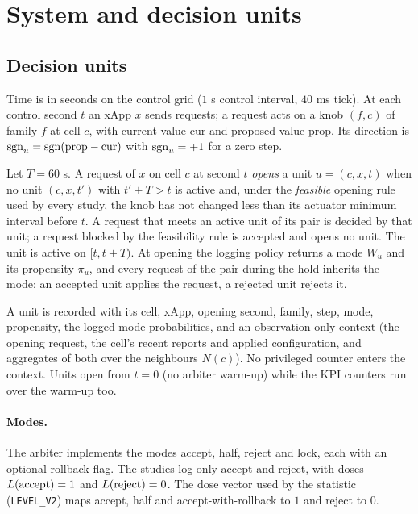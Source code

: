 \section{System and decision units}
\label{spec:sys}

\subsection{Decision units}
\label{spec:sys.unit}

Time is in seconds on the control grid ($1$ s control interval, $40$ ms tick). At each control second $t$ an xApp $x$ sends requests; a request acts on a knob $(f, c)$ of family $f$ at cell $c$, with current value $\mathrm{cur}$ and proposed value $\mathrm{prop}$. Its direction is $\mathrm{sgn}_u = \mathrm{sgn}(\mathrm{prop} - \mathrm{cur})$ with $\mathrm{sgn}_u = +1$ for a zero step.

\begin{definition}
Let $T = 60$ s. A request of $x$ on cell $c$ at second $t$ \emph{opens} a unit $u = (c, x, t)$ when no unit $(c, x, t')$ with $t' + T > t$ is active and, under the \emph{feasible} opening rule used by every study, the knob has not changed less than its actuator minimum interval before $t$. A request that meets an active unit of its pair is decided by that unit; a request blocked by the feasibility rule is accepted and opens no unit. The unit is active on $[t, t + T)$. At opening the logging policy returns a mode $W_u$ and its propensity $\pi_u$, and every request of the pair during the hold inherits the mode: an accepted unit applies the request, a rejected unit rejects it.
\end{definition}

A unit is recorded with its cell, xApp, opening second, family, step, mode, propensity, the logged mode probabilities, and an observation-only context (the opening request, the cell's recent reports and applied configuration, and aggregates of both over the neighbours $N(c)$). No privileged counter enters the context. Units open from $t = 0$ (no arbiter warm-up) while the KPI counters run over the warm-up too.

\paragraph{Modes.} The arbiter implements the modes accept, half, reject and lock, each with an optional rollback flag. The studies log only accept and reject, with doses $L(\text{accept}) = 1$ and $L(\text{reject}) = 0$. The dose vector used by the statistic (\texttt{LEVEL\_V2}) maps accept, half and accept-with-rollback to $1$ and reject to $0$.

